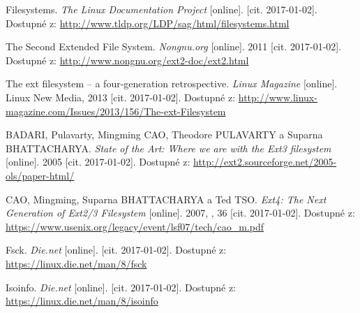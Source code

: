 \begin{literatura}{99}
    Filesystems. \emph{The Linux Documentation Project} [online]. [cit. 2017-01-02]. Dostupné z: \url{http://www.tldp.org/LDP/sag/html/filesystems.html}

    The Second Extended File System. \emph{Nongnu.org} [online]. 2011 [cit. 2017-01-02]. Dostupné z: \url{http://www.nongnu.org/ext2-doc/ext2.html}

    The ext filesystem – a four-generation retrospective. \emph{Linux Magazine} [online]. Linux New Media, 2013 [cit. 2017-01-02]. Dostupné z: \url{http://www.linux-magazine.com/Issues/2013/156/The-ext-Filesystem}

    BADARI, Pulavarty, Mingming CAO, Theodore PULAVARTY a Suparna BHATTACHARYA. \emph{State of the Art: Where we are with the Ext3 filesystem} [online]. 2005 [cit. 2017-01-02]. Dostupné z: \url{http://ext2.sourceforge.net/2005-ols/paper-html/}

    CAO, Mingming, Suparna BHATTACHARYA a Ted TSO. \emph{Ext4: The Next Generation of  Ext2/3 Filesystem} [online]. 2007, , 36 [cit. 2017-01-02]. Dostupné z: \url{https://www.usenix.org/legacy/event/lsf07/tech/cao_m.pdf}

    Fsck. \emph{Die.net} [online]. [cit. 2017-01-02]. Dostupné z: \url{https://linux.die.net/man/8/fsck}

    Isoinfo. \emph{Die.net} [online]. [cit. 2017-01-02]. Dostupné z: \url{https://linux.die.net/man/8/isoinfo}

\end{literatura}
